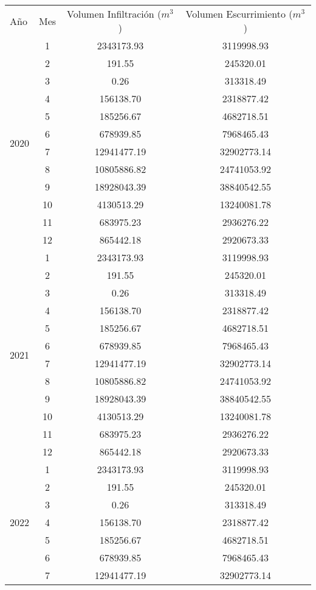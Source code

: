 \documentclass[12pt,letterpaper]{article}
\begin{document}
\begin{table}[H]
\centering
\begin{tabular}{l|c|c|c}
\hline
Año & Mes & Volumen Infiltración ($m^3$) & Volumen Escurrimiento ($m^3$) \\
\cline{1-4}
\multirow[t]{12}{*}{2020} & 1 & 2343173.93 & 3119998.93 \\
 & 2 & 191.55 & 245320.01 \\
 & 3 & 0.26 & 313318.49 \\
 & 4 & 156138.70 & 2318877.42 \\
 & 5 & 185256.67 & 4682718.51 \\
 & 6 & 678939.85 & 7968465.43 \\
 & 7 & 12941477.19 & 32902773.14 \\
 & 8 & 10805886.82 & 24741053.92 \\
 & 9 & 18928043.39 & 38840542.55 \\
 & 10 & 4130513.29 & 13240081.78 \\
 & 11 & 683975.23 & 2936276.22 \\
 & 12 & 865442.18 & 2920673.33 \\
\cline{1-4}
\multirow[t]{12}{*}{2021} & 1 & 2343173.93 & 3119998.93 \\
 & 2 & 191.55 & 245320.01 \\
 & 3 & 0.26 & 313318.49 \\
 & 4 & 156138.70 & 2318877.42 \\
 & 5 & 185256.67 & 4682718.51 \\
 & 6 & 678939.85 & 7968465.43 \\
 & 7 & 12941477.19 & 32902773.14 \\
 & 8 & 10805886.82 & 24741053.92 \\
 & 9 & 18928043.39 & 38840542.55 \\
 & 10 & 4130513.29 & 13240081.78 \\
 & 11 & 683975.23 & 2936276.22 \\
 & 12 & 865442.18 & 2920673.33 \\
\cline{1-4}
\multirow[t]{12}{*}{2022} & 1 & 2343173.93 & 3119998.93 \\
 & 2 & 191.55 & 245320.01 \\
 & 3 & 0.26 & 313318.49 \\
 & 4 & 156138.70 & 2318877.42 \\
 & 5 & 185256.67 & 4682718.51 \\
 & 6 & 678939.85 & 7968465.43 \\
 & 7 & 12941477.19 & 32902773.14 \\

\end{tabular}
\end{table}
\end{document}
